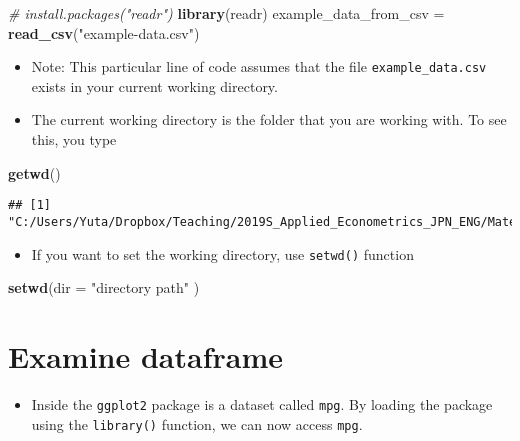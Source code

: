 \documentclass[]{book}
\newenvironment{Shaded}{\begin{snugshade}}{\end{snugshade}}
\newcommand{\KeywordTok}[1]{\textcolor[rgb]{0.13,0.29,0.53}{\textbf{#1}}}
\newcommand{\DataTypeTok}[1]{\textcolor[rgb]{0.13,0.29,0.53}{#1}}
\newcommand{\StringTok}[1]{\textcolor[rgb]{0.31,0.60,0.02}{#1}}
\newcommand{\CommentTok}[1]{\textcolor[rgb]{0.56,0.35,0.01}{\textit{#1}}}
\newcommand{\NormalTok}[1]{#1}
\providecommand{\tightlist}{%
  \setlength{\itemsep}{0pt}\setlength{\parskip}{0pt}}
\begin{document}
\begin{Shaded}
\begin{Highlighting}[]
\CommentTok{# install.packages("readr") }
\KeywordTok{library}\NormalTok{(readr)}
\NormalTok{example_data_from_csv =}\StringTok{ }\KeywordTok{read_csv}\NormalTok{(}\StringTok{"example-data.csv"}\NormalTok{)}
\end{Highlighting}
\end{Shaded}

\begin{itemize}
\tightlist
\item
  Note: This particular line of code assumes that the file
  \texttt{example\_data.csv} exists in your current working directory.
\item
  The current working directory is the folder that you are working with.
  To see this, you type
\end{itemize}

\begin{Shaded}
\begin{Highlighting}[]
\KeywordTok{getwd}\NormalTok{()}
\end{Highlighting}
\end{Shaded}

\begin{verbatim}
## [1] "C:/Users/Yuta/Dropbox/Teaching/2019S_Applied_Econometrics_JPN_ENG/Material_Github"
\end{verbatim}

\begin{itemize}
\tightlist
\item
  If you want to set the working directory, use \texttt{setwd()}
  function
\end{itemize}

\begin{Shaded}
\begin{Highlighting}[]
\KeywordTok{setwd}\NormalTok{(}\DataTypeTok{dir =} \StringTok{"directory path"}\NormalTok{ )}
\end{Highlighting}
\end{Shaded}

\section{Examine dataframe}\label{examine-dataframe}

\begin{itemize}
\tightlist
\item
  Inside the \texttt{ggplot2} package is a dataset called \texttt{mpg}.
  By loading the package using the \texttt{library()} function, we can
  now access \texttt{mpg}.
\end{itemize}
\end{document}
